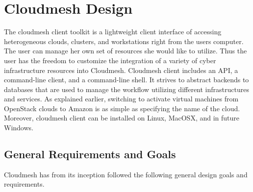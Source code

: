 \documentclass[9pt,twocolumn,twoside]{../../styles/osajnl}
\begin{document}
\section{Cloudmesh Design}
\label{S:cmclient}

The cloudmesh client toolkit \cite{www-cloudmesh-client} is a
lightweight client interface of accessing heterogeneous clouds,
clusters, and workstations right from the users computer. The user can
manage her own set of resources she would like to utilize. Thus the
user has the freedom to customize the integration of a variety of
cyber infrastructure resources into Cloudmesh. Cloudmesh client
includes an API, a command-line client, and a command-line shell. It
strives to abstract backends to databases that are used to manage the
workflow utilizing different infrastructures and services. As
explained earlier, switching to activate virtual machines from
OpenStack clouds to Amazon is as simple as specifying the name of the
cloud. Moreover, cloudmesh client can be installed on Linux, MacOSX,
and in future Windows.

\subsection{General Requirements and Goals}

Cloudmesh has from its inception followed the following general design
goals and requirements.
\end{document}
